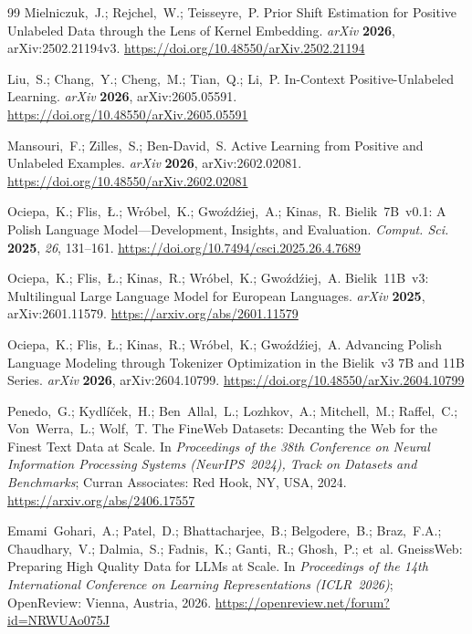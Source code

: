 \documentclass[applsci,article,submit,pdftex,moreauthors]{Definitions/mdpi}
\begin{document}
\begin{thebibliography}{99}
Mielniczuk,~J.; Rejchel,~W.; Teisseyre,~P.
Prior Shift Estimation for Positive Unlabeled Data through the Lens of Kernel Embedding.
\textit{arXiv} \textbf{2026}, arXiv:2502.21194v3.
\url{https://doi.org/10.48550/arXiv.2502.21194}

Liu,~S.; Chang,~Y.; Cheng,~M.; Tian,~Q.; Li,~P.
In-Context Positive-Unlabeled Learning.
\textit{arXiv} \textbf{2026}, arXiv:2605.05591.
\url{https://doi.org/10.48550/arXiv.2605.05591}

Mansouri,~F.; Zilles,~S.; Ben-David,~S.
Active Learning from Positive and Unlabeled Examples.
\textit{arXiv} \textbf{2026}, arXiv:2602.02081.
\url{https://doi.org/10.48550/arXiv.2602.02081}

Ociepa,~K.; Flis,~{\L}.; Wr\'{o}bel,~K.; Gwo\'{z}d\'{z}iej,~A.; Kinas,~R.
Bielik~7B~v0.1: A Polish Language Model---Development, Insights, and Evaluation.
\textit{Comput. Sci.} \textbf{2025}, \textit{26}, 131--161.
\url{https://doi.org/10.7494/csci.2025.26.4.7689}

Ociepa,~K.; Flis,~{\L}.; Kinas,~R.; Wr\'{o}bel,~K.; Gwo\'{z}d\'{z}iej,~A.
Bielik~11B~v3: Multilingual Large Language Model for European Languages.
\textit{arXiv} \textbf{2025}, arXiv:2601.11579.
\url{https://arxiv.org/abs/2601.11579}

Ociepa,~K.; Flis,~{\L}.; Kinas,~R.; Wr\'{o}bel,~K.; Gwo\'{z}d\'{z}iej,~A.
Advancing Polish Language Modeling through Tokenizer Optimization
in the Bielik~v3 7B and 11B Series.
\textit{arXiv} \textbf{2026}, arXiv:2604.10799.
\url{https://doi.org/10.48550/arXiv.2604.10799}

Penedo,~G.; Kydl\'{i}\v{c}ek,~H.; Ben~Allal,~L.; Lozhkov,~A.; Mitchell,~M.;
Raffel,~C.; Von~Werra,~L.; Wolf,~T.
The FineWeb Datasets: Decanting the Web for the Finest Text Data at Scale.
In \textit{Proceedings of the 38th Conference on Neural Information Processing
Systems (NeurIPS~2024), Track on Datasets and Benchmarks};
Curran Associates: Red Hook, NY, USA, 2024.
\url{https://arxiv.org/abs/2406.17557}

Emami~Gohari,~A.; Patel,~D.; Bhattacharjee,~B.; Belgodere,~B.; Braz,~F.A.;
Chaudhary,~V.; Dalmia,~S.; Fadnis,~K.; Ganti,~R.; Ghosh,~P.; et~al.
GneissWeb: Preparing High Quality Data for LLMs at Scale.
In \textit{Proceedings of the 14th International Conference on Learning
Representations (ICLR~2026)};
OpenReview: Vienna, Austria, 2026.
\url{https://openreview.net/forum?id=NRWUAo075J}


\end{thebibliography}
\end{document}
